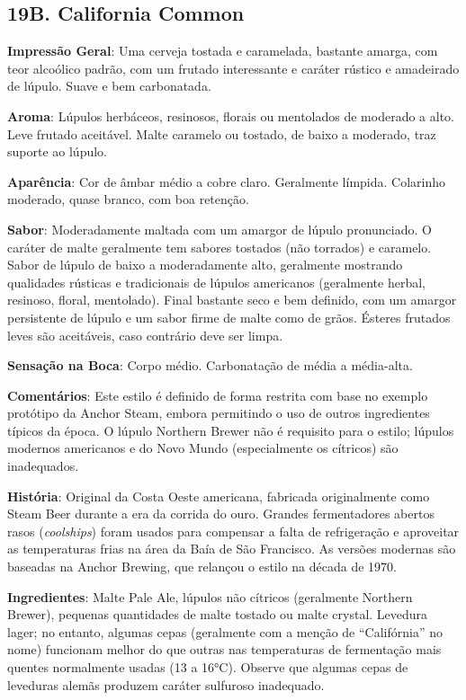 \subsection*{19B. California Common}
\textbf{Impressão Geral}: Uma cerveja tostada e caramelada, bastante amarga, com teor alcoólico padrão, com um frutado interessante e caráter rústico e amadeirado de lúpulo. Suave e bem carbonatada.

\textbf{Aroma}: Lúpulos herbáceos, resinosos, florais ou mentolados de moderado a alto. Leve frutado aceitável. Malte caramelo ou tostado, de baixo a moderado, traz suporte ao lúpulo.

\textbf{Aparência}: Cor de âmbar médio a cobre claro. Geralmente límpida. Colarinho moderado, quase branco, com boa retenção.

\textbf{Sabor}: Moderadamente maltada com um amargor de lúpulo pronunciado. O caráter de malte geralmente tem sabores tostados (não torrados) e caramelo. Sabor de lúpulo de baixo a moderadamente alto, geralmente mostrando qualidades rústicas e tradicionais de lúpulos americanos (geralmente herbal, resinoso, floral, mentolado). Final bastante seco e bem definido, com um amargor persistente de lúpulo e um sabor firme de malte como de grãos. Ésteres frutados leves são aceitáveis, caso contrário deve ser limpa.

\textbf{Sensação na Boca}: Corpo médio. Carbonatação de média a média-alta.

\textbf{Comentários}: Este estilo é definido de forma restrita com base no exemplo protótipo da Anchor Steam, embora permitindo o uso de outros ingredientes típicos da época. O lúpulo Northern Brewer não é requisito para o estilo; lúpulos modernos americanos e do Novo Mundo (especialmente os cítricos) são inadequados.

\textbf{História}: Original da Costa Oeste americana, fabricada originalmente como Steam Beer durante a era da corrida do ouro. Grandes fermentadores abertos rasos (\textit{coolships}) foram usados para compensar a falta de refrigeração e aproveitar as temperaturas frias na área da Baía de São Francisco. As versões modernas são baseadas na Anchor Brewing, que relançou o estilo na década de 1970.

\textbf{Ingredientes}: Malte Pale Ale, lúpulos não cítricos (geralmente Northern Brewer), pequenas quantidades de malte tostado ou malte crystal. Levedura lager; no entanto, algumas cepas (geralmente com a menção de “Califórnia” no nome) funcionam melhor do que outras nas temperaturas de fermentação mais quentes normalmente usadas (13 a 16°C). Observe que algumas cepas de leveduras alemãs produzem caráter sulfuroso inadequado.

